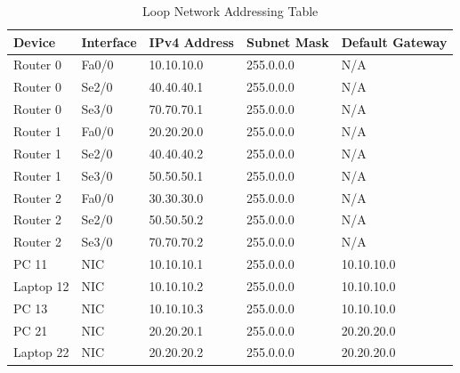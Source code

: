 \documentclass[11pt]{article}
\begin{document}
\begin{table}[h!]
    \centering
    \caption{Loop Network Addressing Table}
    \begin{tabular}{@{}lllll@{}}
        \toprule
        \textbf{Device} & \textbf{Interface} & \textbf{IPv4 Address} & \textbf{Subnet Mask} & \textbf{Default Gateway} \\ \midrule
        Router 0        & Fa0/0              & 10.10.10.0            & 255.0.0.0            & N/A                      \\
        Router 0        & Se2/0              & 40.40.40.1            & 255.0.0.0            & N/A                      \\
        Router 0        & Se3/0              & 70.70.70.1            & 255.0.0.0            & N/A                      \\
        Router 1        & Fa0/0              & 20.20.20.0            & 255.0.0.0            & N/A                      \\
        Router 1        & Se2/0              & 40.40.40.2            & 255.0.0.0            & N/A                      \\
        Router 1        & Se3/0              & 50.50.50.1            & 255.0.0.0            & N/A                      \\
        Router 2        & Fa0/0              & 30.30.30.0            & 255.0.0.0            & N/A                      \\
        Router 2        & Se2/0              & 50.50.50.2            & 255.0.0.0            & N/A                      \\
        Router 2        & Se3/0              & 70.70.70.2            & 255.0.0.0            & N/A                      \\
        PC 11           & NIC                & 10.10.10.1            & 255.0.0.0            & 10.10.10.0               \\
        Laptop 12       & NIC                & 10.10.10.2            & 255.0.0.0            & 10.10.10.0               \\
        PC 13           & NIC                & 10.10.10.3            & 255.0.0.0            & 10.10.10.0               \\
        PC 21           & NIC                & 20.20.20.1            & 255.0.0.0            & 20.20.20.0               \\
        Laptop 22       & NIC                & 20.20.20.2            & 255.0.0.0            & 20.20.20.0               \\

\end{tabular}
\end{table}
\end{document}
